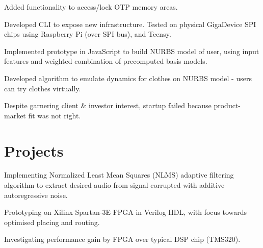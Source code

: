 \documentclass[]{deedy}
\begin{document}
\begin{minipage}[t]{0.69\textwidth}
\begin{flushleft}
\begin{tightemize}
\item Added functionality to access/lock OTP memory areas.
\item Developed CLI to expose new infrastructure. Tested on physical GigaDevice SPI chips using Raspberry Pi (over SPI bus), and Teensy.
\end{tightemize}
\sectionsep
%
\vspace{1.1pt}
\begin{tightemize}
\item Implemented prototype in JavaScript to build NURBS model of user, using input features and weighted combination of precomputed basis models.
\item Developed algorithm to emulate dynamics for clothes on NURBS model - users can try clothes virtually.
\item Despite garnering client \& investor interest, startup failed because product-market fit was not right.
\end{tightemize}
\sectionsep
\section{Projects}
%
\vspace{1.1pt}
\begin{tightemize}
\item Implementing Normalized Least Mean Squares (NLMS) adaptive filtering algorithm to extract desired audio from signal corrupted with additive autoregressive noise.
\item Prototyping on Xilinx Spartan-3E FPGA in Verilog HDL, with focus towards optimised placing and routing.
\item Investigating performance gain by FPGA over typical DSP chip (TMS320).
\end{tightemize}
\sectionsep
%
\end{flushleft}
\end{minipage}
\end{document}
